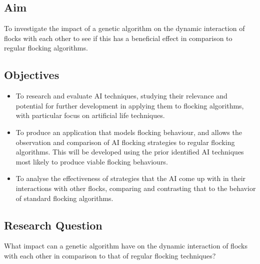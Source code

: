\subsection{Aim} 
To investigate the impact of a genetic algorithm on the dynamic interaction of flocks with each other to see if this has a beneficial effect in comparison to regular flocking algorithms.

\subsection{Objectives} %
\begin{itemize}
\item %
To research and evaluate AI techniques, studying their relevance and potential for further development in applying them to flocking algorithms, with particular focus on artificial life techniques. 
\item
To produce an application that models flocking behaviour, and allows the observation and comparison of AI flocking strategies to regular flocking algorithms. This will be developed using the prior identified AI techniques most likely to produce viable flocking behaviours. 
\item
To analyse the effectiveness of strategies that the AI come up with in their interactions with other flocks, comparing and contrasting that to the behavior of standard flocking algorithms.
\end{itemize}

\subsection{Research Question}
What impact can a genetic algorithm have on the dynamic interaction of flocks with each other in comparison to that of regular flocking techniques?


